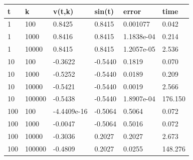 \documentclass[12pt]{article}
\begin{document}
\begin{tabular}{| l | l | l | l | l | l |}
\hline
t  &  k   &  v(t,k) & sin(t) & error & time \\
\hline
1  &  100 &  0.8425 & 0.8415 & 0.001077 & 0.042 \\
\hline
1  &  1000 &  0.8416 & 0.8415 & 1.1838e-04 & 0.214 \\
\hline
1  &  10000 &  0.8415 & 0.8415 & 1.2057e-05 & 2.536 \\
\hline
10  &  100 &  -0.3622 & -0.5440 & 0.1819 & 0.070 \\
\hline
10  &  1000 &  -0.5252 & -0.5440 & 0.0189 & 0.209 \\
\hline
10  &  10000 &  -0.5421 & -0.5440 & 0.0019 & 2.566 \\
\hline
10  &  100000 &  -0.5438 & -0.5440 & 1.8907e-04 & 176.150\\
\hline
100  &  100 &  -4.4409e-16 & -0.5064 & 0.5064 & 0.072 \\
\hline
100  &  1000 &  -0.0047 & -0.5064 & 0.5016 & 0.072 \\
\hline
100  &  10000 &  -0.3036 & 0.2027 & 0.2027 & 2.673 \\
\hline
100  &  100000 &  -0.4809 & 0.2027 & 0.0255 & 148.276  \\
\hline
\end{tabular}

\clearpage

\end{document}
